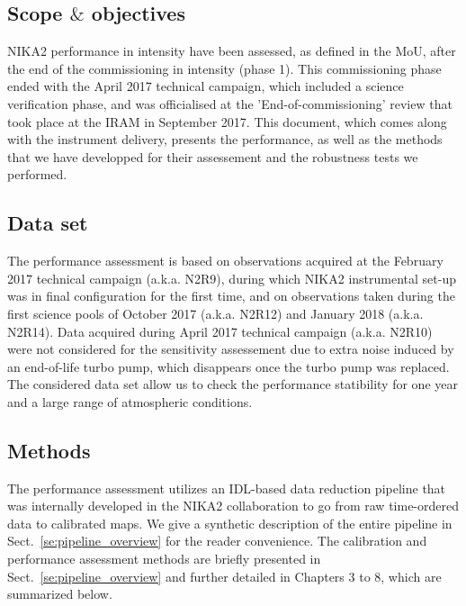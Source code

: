 
\subsection*{Scope $\&$ objectives}
NIKA2 performance in intensity have been assessed, as defined in the
MoU, after the end of the commissioning in intensity (phase 1). This
commissioning phase ended with the April 2017 technical campaign,
which included a science verification phase, and was officialised at
the 'End-of-commissioning' review that took place at the IRAM in September
2017. This document, which comes along with the instrument delivery,
presents the performance, as well as the methods that we have developped
for their assessement and the robustness tests we performed.

\subsection*{Data set}
The performance assessment is based on observations acquired at
the February 2017 technical campaign (a.k.a. N2R9), during which NIKA2
instrumental set-up was in final configuration for the first time, and
on observations taken during the first science pools of October 2017
(a.k.a. N2R12) and January 2018 (a.k.a. N2R14). Data acquired during
April 2017 technical campaign (a.k.a. N2R10) were not considered for
the sensitivity assessement due to extra noise induced by an
end-of-life turbo pump, which disappears once the turbo pump was
replaced. The considered data set allow us to check the performance
statibility for one year and a large range of atmospheric conditions. 

\subsection*{Methods}

The performance assessment utilizes an IDL-based data reduction
pipeline that was internally developed in the NIKA2 collaboration
to go from raw time-ordered data to calibrated maps. We give a
synthetic description of the entire pipeline in
Sect.~\ref{se:pipeline_overview} for the reader convenience. The
calibration and performance assessment methods are briefly presented
in Sect.~\ref{se:pipeline_overview} and further detailed in Chapters 3
to 8, which are summarized below.

